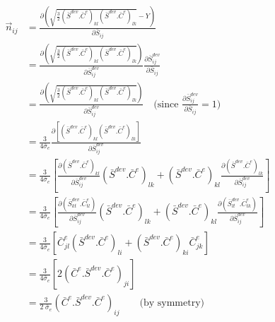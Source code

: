 \documentclass[]{scrreprt}
\begin{document}
\begin{align}
	\vec{n}_{ij} & = \frac{\partial \left( \sqrt{\frac{3}{2}\left( \bar{S}^{dev}.\bar{C}^e \right)_{kl}\left( \bar{S}^{dev}.\bar{C}^e \right)_{lk}} - Y \right)}{\partial \bar{S}_{ij}} \nonumber \\
	        & = 	\frac{\partial \left( \sqrt{\frac{3}{2}\left( \bar{S}^{dev}.\bar{C}^e  \right)_{kl} \left( \bar{S}^{dev}.\bar{C}^e \right)_{lk}}\right)}{\partial \bar{S}^{dev}_{ij}} \frac{\partial \bar{S}^{dev}_{ij}}{\partial \bar{S}_{ij}}\nonumber \\
	        & = 	\frac{\partial \left( \sqrt{\frac{3}{2}\left( \bar{S}^{dev}.\bar{C}^e  \right)_{kl} \left( \bar{S}^{dev}.\bar{C}^e \right)_{lk}}\right)}{\partial \bar{S}^{dev}_{ij}} \quad \text{(since $\frac{\partial \bar{S}^{dev}_{ij}}{\partial \bar{S}_{ij}}=1$)}\nonumber \\
	        & = 	\frac{3}{4\bar{\sigma}_e}\frac{\partial \left[ \left( \bar{S}^{dev}.\bar{C}^e  \right)_{kl} \left( \bar{S}^{dev}.\bar{C}^e \right)_{lk}\right]}{\partial \bar{S}^{dev}_{ij}} \nonumber \\
	        & = 	\frac{3}{4\bar{\sigma}_e}\left[\frac{\partial  \left( \bar{S}^{dev}.\bar{C}^e  \right)_{kl} }{\partial \bar{S}^{dev}_{ij}} \left( \bar{S}^{dev}.\bar{C}^e \right)_{lk}+ 
	        \left( \bar{S}^{dev}.\bar{C}^e  \right)_{kl} \frac{\partial   \left( \bar{S}^{dev}.\bar{C}^e \right)_{lk}}{\partial \bar{S}^{dev}_{ij}} 
	        \right] \nonumber \\
	        & = 	\frac{3}{4\bar{\sigma}_e}\left[\frac{\partial  \left( \bar{S}^{dev}_{kt}.\bar{C}^e_{tl}  \right) }{\partial \bar{S}^{dev}_{ij}} \left( \bar{S}^{dev}.\bar{C}^e \right)_{lk}+ 
	        \left( \bar{S}^{dev}.\bar{C}^e  \right)_{kl} \frac{\partial   \left( \bar{S}^{dev}_{lt}.\bar{C}^e_{tk} \right)}{\partial \bar{S}^{dev}_{ij}} 
	        \right] \nonumber \\
	        & = 	\frac{3}{4\bar{\sigma}_e}\left[\bar{C}^e_{jl} \left( \bar{S}^{dev}.\bar{C}^e \right)_{li}+ 
	        \left( \bar{S}^{dev}.\bar{C}^e  \right)_{ki} \bar{C}^e_{jk} \right] \nonumber \\
	        & = 	\frac{3}{4\bar{\sigma}_e}\left[2 \left(\bar{C}^e.\bar{S}^{dev}.\bar{C}^e \right)_{ji} \right] \nonumber \\
	        & = \frac{3}{2\;\bar{\sigma}_e} \left(\bar{C}^e.\bar{S}^{dev}.\bar{C}^e\right)_{ij} \qquad \text{(by symmetry)}
\end{align}




\nocite{*}
\end{document}
